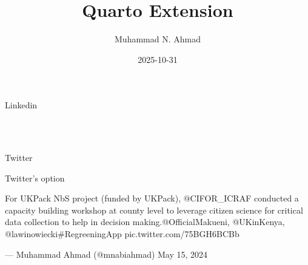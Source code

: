 \documentclass[
  letterpaper,
  DIV=11,
  numbers=noendperiod]{scrartcl}
\title{Quarto Extension}
\author{Muhammad N. Ahmad}
\date{2025-10-31}
\begin{document}
\maketitle


\begin{centering}\begin{tcolorbox}[hbox,
colframe=lightgray,
colback=white]

\textcolor{Orchid}{{\Large {\faMastodon}}} %

\href{https://sciencemastodon.com/@gdyson/111371030805595929}{}

\end{tcolorbox}\end{centering}
\vspace{1em}

Linkedin \begin{centering}\begin{tcolorbox}[hbox,
colframe=lightgray,
colback=white]
\\
\textcolor{RoyalBlue}{{\Large {\faLinkedin}}} %
\href{https://www.linkedin.com/feed/update/urn:li:activity:7335234505370169344}{}\\

\end{tcolorbox}\end{centering}
\vspace{1em}

Twitter

Twitter's option

For UKPack NbS project (funded by UKPack), @CIFOR\_ICRAF conducted a
capacity building workshop at county level to leverage citizen science
for critical data collection to help in decision
making.@OfficialMakueni, @UKinKenya, @lawinowiecki\#RegreeningApp
pic.twitter.com/75BGH6BCBb

--- Muhammad Ahmad (@mnabiahmad) May 15, 2024
\end{document}
